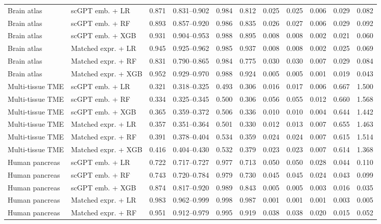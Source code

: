 \begin{landscape}
\begin{longtable}{llccccccccc}
\addlinespace
Brain atlas & scGPT emb. + LR & 0.871 & 0.831--0.902 & 0.984 & 0.812 & 0.025 & 0.025 & 0.006 & 0.029 & 0.082 \\
Brain atlas & scGPT emb. + RF & 0.893 & 0.857--0.920 & 0.986 & 0.835 & 0.026 & 0.027 & 0.006 & 0.029 & 0.092 \\
Brain atlas & scGPT emb. + XGB & 0.931 & 0.904--0.953 & 0.988 & 0.895 & 0.008 & 0.008 & 0.002 & 0.021 & 0.060 \\
Brain atlas & Matched expr. + LR & 0.945 & 0.925--0.962 & 0.985 & 0.937 & 0.008 & 0.008 & 0.002 & 0.025 & 0.069 \\
Brain atlas & Matched expr. + RF & 0.831 & 0.790--0.865 & 0.984 & 0.775 & 0.030 & 0.030 & 0.007 & 0.029 & 0.084 \\
Brain atlas & Matched expr. + XGB & 0.952 & 0.929--0.970 & 0.988 & 0.924 & 0.005 & 0.005 & 0.001 & 0.019 & 0.043 \\
\addlinespace
Multi-tissue TME & scGPT emb. + LR & 0.321 & 0.318--0.325 & 0.493 & 0.306 & 0.016 & 0.017 & 0.006 & 0.667 & 1.500 \\
Multi-tissue TME & scGPT emb. + RF & 0.334 & 0.325--0.345 & 0.500 & 0.306 & 0.056 & 0.055 & 0.012 & 0.660 & 1.568 \\
Multi-tissue TME & scGPT emb. + XGB & 0.365 & 0.359--0.372 & 0.506 & 0.336 & 0.010 & 0.010 & 0.004 & 0.644 & 1.442 \\
Multi-tissue TME & Matched expr. + LR & 0.357 & 0.351--0.364 & 0.501 & 0.330 & 0.012 & 0.013 & 0.007 & 0.655 & 1.463 \\
Multi-tissue TME & Matched expr. + RF & 0.391 & 0.378--0.404 & 0.534 & 0.359 & 0.024 & 0.024 & 0.007 & 0.615 & 1.514 \\
Multi-tissue TME & Matched expr. + XGB & 0.416 & 0.404--0.430 & 0.532 & 0.379 & 0.023 & 0.023 & 0.007 & 0.614 & 1.368 \\
\addlinespace
Human pancreas & scGPT emb. + LR & 0.722 & 0.717--0.727 & 0.977 & 0.713 & 0.050 & 0.050 & 0.028 & 0.044 & 0.110 \\
Human pancreas & scGPT emb. + RF & 0.743 & 0.720--0.784 & 0.979 & 0.730 & 0.045 & 0.045 & 0.024 & 0.043 & 0.099 \\
Human pancreas & scGPT emb. + XGB & 0.874 & 0.817--0.920 & 0.989 & 0.843 & 0.005 & 0.005 & 0.003 & 0.016 & 0.035 \\
Human pancreas & Matched expr. + LR & 0.983 & 0.962--0.999 & 0.998 & 0.987 & 0.001 & 0.001 & 0.001 & 0.003 & 0.005 \\
Human pancreas & Matched expr. + RF & 0.951 & 0.912--0.979 & 0.995 & 0.919 & 0.038 & 0.038 & 0.020 & 0.015 & 0.052 \\

\end{longtable}
\end{landscape}
